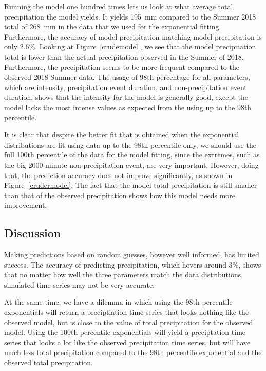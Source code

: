 \documentclass[11pt]{report}
\begin{document}
Running the model one hundred times lets us look at what average total
precipitation the model yields. It yields 195~mm compared to the Summer 2018
total of 268~mm in the data that we used for the exponential
fitting. Furthermore, the accuracy of model precipitation matching model
precipitation is only 2.6$\%$. Looking at Figure~\ref{crudemodel}, we see
that the model precipitation total is lower than the actual precipitation
observed in the Summer of 2018. Furthermore, the precipitation seems to be
more frequent compared to the observed 2018 Summer data. The usage of 98th
percentage for all parameters, which are intensity, precipitation event
duration, and non-precipitation event duration, shows that the intensity for
the model is generally good, except the model lacks the most intense values
as expected from the using up to the 98th percentile.

It is clear that despite the better fit that is obtained when the
exponential distributions are fit using data up to the 98th percentile only,
we should use the full 100th percentile of the data for the model fitting,
since the extremes, such as the big 2000-minute non-precipitation event, are
very important. However, doing that, the prediction accuracy does not
improve significantly, as shown in Figure~\ref{crudermodel}.  The fact that
the model total precipitation is still smaller than that of the observed
precipitation shows how this model needs more improvement.


\subsection{Discussion}\label{sec:spc_d}

Making predictions based on random guesses, however well informed, has
limited success. The accuracy of predicting precipitation, which hovers
around 3\%, shows that no matter how well the three parameters match the
data distributions, simulated time series may not be very accurate.

At the same time, we have a dilemma in which using the 98th percentile
exponentials will return a preciptiation time series that looks nothing like
the observed model, but is close to the value of total precipitation for the
observed model. Using the 100th percentile exponentials will yield a
preciptation time series that looks a lot like the observed precipitation
time series, but will have much less total precipitation compared to the
98th percentile exponential and the observed total precipitation.
\end{document}
